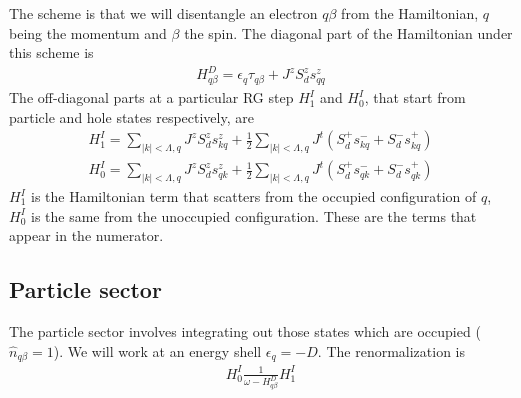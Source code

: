 The scheme is that we will disentangle an electron \(q\beta\) from the Hamiltonian, \(q\) being the momentum and \(\beta\) the spin. The diagonal part of the Hamiltonian under this scheme is
\begin{equation}\begin{aligned}
\label{kondodiag}
H^D_{q\beta} = \epsilon_q \tau_{q\beta} + J^z S_d^z s_{qq}^z
\end{aligned}\end{equation}
The off-diagonal parts at a particular RG step \(H^I_1\) and \(H^I_0\), that start from particle and hole states respectively, are
\begin{equation}\begin{aligned}
	H^I_1 = \sum_{|k|<\Lambda,q} J^z S_d^z s^z_{kq} + \frac{1}{2}\sum_{|k|<\Lambda,q} J^t \left(S_d^+ s^-_{kq} + S_d^- s^+_{kq}\right)\\
	H^I_0 = \sum_{|k|<\Lambda,q} J^z S_d^z s^z_{qk} + \frac{1}{2}\sum_{|k|<\Lambda,q} J^t \left(S_d^+ s^-_{qk}  + S_d^- s^+_{qk}\right)
\end{aligned}\end{equation}
\(H^I_1\) is the Hamiltonian term that scatters from the occupied configuration of \(q\), \(H^I_0\) is the same from the unoccupied configuration.
These are the terms that appear in the numerator.
\subsection{Particle sector}
The particle sector involves integrating out those states which are occupied (\(\hat n_{q\beta}=1\)). We will work at an energy  shell \(\epsilon_q = -D\). The renormalization is
\begin{equation}\begin{aligned}
	H^I_0 \frac{1}{\omega - H^D_{q\beta}} H^I_1
\end{aligned}\end{equation}

